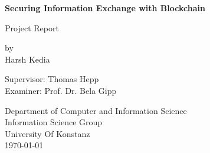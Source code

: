 \begin{titlepage}
    \begin{center}
        \vspace*{1cm}
 
        \Huge
        \textbf{Securing Information Exchange with Blockchain}
 
        \vspace{0.5cm}
        \LARGE
        Project Report
 		
 		\vfill
        \vspace{0.5cm}
 
        {\normalsize by}\\
        {\Large Harsh Kedia}
 
        \vfill
        \vspace{0.5cm}
        
        {\Large Supervisor: Thomas Hepp}\\
        {\Large Examiner: Prof. Dr. Bela Gipp}
 		
 		\vfill
 		\vspace{0.5cm}
 		
        \Large
        Department of Computer and Information Science\\
        Information Science Group\\
        University Of Konstanz\\
        \today
 
    \end{center}
\end{titlepage}